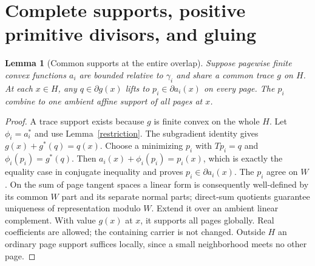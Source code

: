 \documentclass[11pt]{article}
\newtheorem{lemma}[theorem]{Lemma}
\theoremstyle{definition}\newtheorem{definition}[theorem]{Definition}
\theoremstyle{remark}\newtheorem{remark}[theorem]{Remark}
\begin{document}
\section{Complete supports, positive primitive divisors, and gluing}
\begin{lemma}[Common supports at the entire overlap]\label{support}
Suppose pagewise finite convex functions $a_i$ are bounded relative to $\gamma_i$ and share a common trace $g$ on $H$. At each $x\in H$, any $q\in\partial g(x)$ lifts to $p_i\in\partial a_i(x)$ on every page. The $p_i$ combine to one ambient affine support of all pages at $x$.
\end{lemma}
\begin{proof}
A trace support exists because $g$ is finite convex on the whole $H$. Let $\phi_i=a_i^*$ and use Lemma~\ref{restriction}. The subgradient identity gives $g(x)+g^*(q)=q(x)$. Choose a minimizing $p_i$ with $Tp_i=q$ and $\phi_i(p_i)=g^*(q)$. Then
$a_i(x)+\phi_i(p_i)=p_i(x)$, which is exactly the equality case in conjugate inequality and proves $p_i\in\partial a_i(x)$. The $p_i$ agree on $W$. On the sum of page tangent spaces a linear form is consequently well-defined by its common $W$ part and its separate normal parts; direct-sum quotients guarantee uniqueness of representation modulo $W$. Extend it over an ambient linear complement. With value $g(x)$ at $x$, it supports all pages globally. Real coefficients are allowed; the containing carrier is not changed. Outside $H$ an ordinary page support suffices locally, since a small neighborhood meets no other page.
\end{proof}
\end{document}
